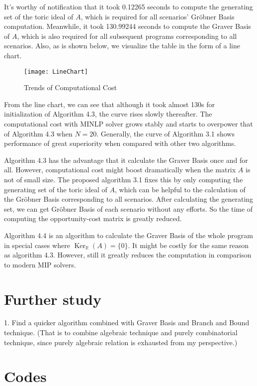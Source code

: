 \documentclass{article}
\theoremstyle{plain}
\theoremstyle{definition}
\begin{document}
\begin{propsition}
It's worthy of notification that it took 0.12265 seconds  to compute the generating set of the toric ideal of $A$, which is  required for all scenarios' Gröbner Basis computation. Meanwhile, it took 130.99244 seconds to compute the Graver Basis of $A$, which is also required for all subsequent programs corresponding to all scenarios. Also, as is shown below, we visualize the table in the form of a line chart.

\begin{figure}[h]
\centering
\texttt{[image: LineChart]}
\caption{Trends of Computational Cost}
\end{figure}

From the line chart, we can see that although it took almost 130s  for initialization of Algorithm 4.3, the curve rises slowly thereafter. The computational cost with MINLP solver grows stably and starts to overpower that of Algorithm 4.3 when $N=20$. Generally, the curve of Algorithm 3.1 shows performance of great superiority when compared with other two algorithms.

Algorithm 4.3 has the advantage that it calculate the Graver Basis once and for all. However, computational cost might boost dramatically when the matrix $A$ is not of small size. The proposed algorithm 3.1 fixes this by only computing the generating set of the toric ideal of $A$, which can be  helpful to the calculation of the Gröbner Basis corresponding to all scenarios. After calculating the generating set, we can get Gröbner Basis of each scenario without any efforts. So the time of computing the opportunity-cost matrix is greatly reduced.

Algorithm 4.4 is an algorithm to calculate the Graver Basis of the whole program in special cases where $\operatorname{Ker}_{\mathbb{R}}(A)=\{0\}$. It might be costly for the same reason as algorithm 4.3. However, still it greatly reduces the computation in comparison to modern MIP solvers.


\section{Further study}
1. Find a quicker algorithm combined with Graver Basis and Branch and Bound technique.
(That is to combine algebraic technique and purely combinatorial technique, since purely algebraic relation is exhausted from my perspective.)

\newpage
\section{Codes}

\end{propsition}
\end{document}
